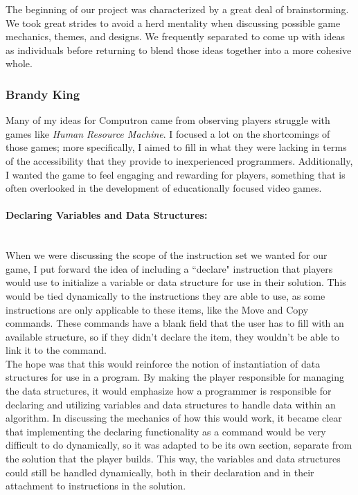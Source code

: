 The beginning of our project was characterized by a great deal of brainstorming. We took great strides
to avoid a herd mentality when discussing possible game mechanics, themes, and designs. We frequently
separated to come up with ideas as individuals before returning to blend those ideas together into a more
cohesive whole.


\subsubsection{Brandy King}
Many of my ideas for Computron came from observing players struggle with games like \textit{Human
Resource Machine}. I focused a lot on the shortcomings of those games; more specifically, I aimed to fill in
what they were lacking in terms of the accessibility that they provide to inexperienced programmers.
Additionally, I wanted the game to feel engaging and rewarding for players, something that is often
overlooked in the development of educationally focused video games. \\

\paragraph{Declaring Variables and Data Structures:} ~\\
When we were discussing the scope of the instruction set we wanted for our game, I put forward the idea
of including a ``declare" instruction that players would use to initialize a variable or data structure for use
in their solution. This would be tied dynamically to the instructions they are able to use, as some instructions
are only applicable to these items, like the Move and Copy commands. These commands have a blank field
that the user has to fill with an available structure, so if they didn't declare the item, they wouldn't be able to
link it to the command.\\

The hope was that this would reinforce the notion of instantiation of data structures for use in a program. By
making the player responsible for managing the data structures, it would emphasize how a programmer
is responsible for declaring and utilizing variables and data structures to handle data within an algorithm. In
discussing the mechanics of how this would work, it became clear that implementing the declaring functionality
as a command would be very difficult to do dynamically, so it was adapted to be its own section, separate from
the solution that the player builds. This way, the variables and data structures could still be handled dynamically,
both in their declaration and in their attachment to instructions in the solution.\\

